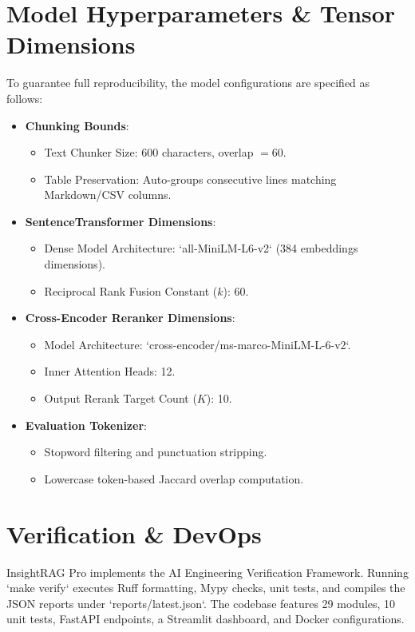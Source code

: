 \documentclass[11pt,journal,onecolumn]{IEEEtran}
\begin{document}
\section{Model Hyperparameters \& Tensor Dimensions}
To guarantee full reproducibility, the model configurations are specified as follows:
\begin{itemize}
    \item \textbf{Chunking Bounds}:
    \begin{itemize}
        \item Text Chunker Size: 600 characters, overlap $= 60$.
        \item Table Preservation: Auto-groups consecutive lines matching Markdown/CSV columns.
    \end{itemize}
    \item \textbf{SentenceTransformer Dimensions}:
    \begin{itemize}
        \item Dense Model Architecture: `all-MiniLM-L6-v2` (384 embeddings dimensions).
        \item Reciprocal Rank Fusion Constant ($k$): 60.
    \end{itemize}
    \item \textbf{Cross-Encoder Reranker Dimensions}:
    \begin{itemize}
        \item Model Architecture: `cross-encoder/ms-marco-MiniLM-L-6-v2`.
        \item Inner Attention Heads: 12.
        \item Output Rerank Target Count ($K$): 10.
    \end{itemize}
    \item \textbf{Evaluation Tokenizer}:
    \begin{itemize}
        \item Stopword filtering and punctuation stripping.
        \item Lowercase token-based Jaccard overlap computation.
    \end{itemize}
\end{itemize}

\section{Verification \& DevOps}
InsightRAG Pro implements the AI Engineering Verification Framework. Running `make verify` executes Ruff formatting, Mypy checks, unit tests, and compiles the JSON reports under `reports/latest.json`. The codebase features 29 modules, 10 unit tests, FastAPI endpoints, a Streamlit dashboard, and Docker configurations.
\end{document}
